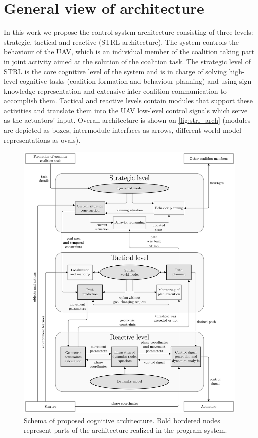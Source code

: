 \documentclass[review]{elsarticle}
\begin{document}
\section{General view of architecture}\label{sec:general}

In this work we propose the control system architecture consisting of three levels: strategic, tactical and reactive (STRL architecture). The system controls the behaviour of the UAV, which is an individual member of the coalition taking part in joint activity aimed at the solution of the coalition task. The strategic level of STRL is the core cognitive level of the system and is in charge of solving high-level cognitive tasks (coalition formation and behaviour planning) and using sign knowledge representation \cite{Osipov2014} and extensive inter-coalition communication to accomplish them. Tactical and reactive levels contain modules that support these activities and translate them into the UAV low-level control signals which serve as the actuators' input. Overall architecture is shown on \autoref{fig:strl_arch} (modules are depicted as boxes, intermodule interfaces as arrows, different world model representations as ovals).

\begin{figure}[h]
	\centering
		\includegraphics[width=\textwidth]{strl_arch_real_eng.jpg}
	\caption{Schema of proposed cognitive architecture. Bold bordered nodes represent parts of the architecture realized in the program system.}
	\label{fig:strl_arch}
\end{figure}
\end{document}
